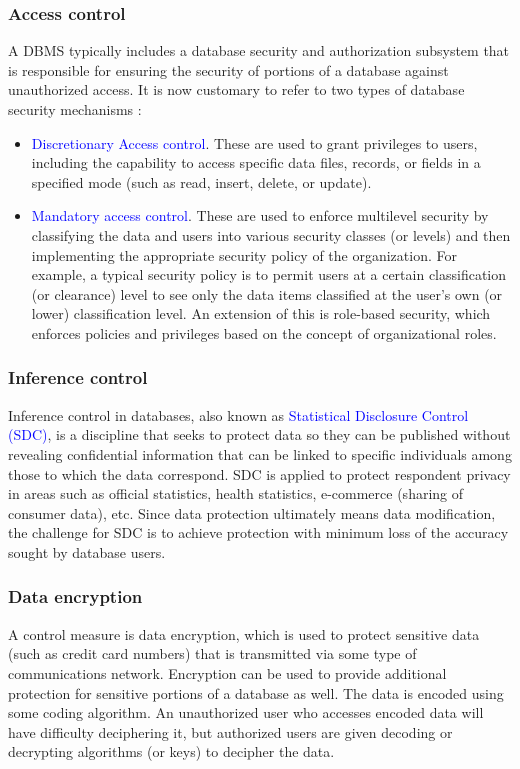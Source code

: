 \documentclass[a4paper]{article}
\numberwithin{equation}{section}
\begin{document}
\subsubsection{Access control}
A DBMS typically includes a database security and authorization subsystem that is responsible for ensuring the security of portions of a database against unauthorized access. It is now customary to refer to two types of database security mechanisms : 
\begin{itemize}
    \item \textcolor{blue}{Discretionary Access control}. These are used to grant privileges to users, including the capability to access specific data files, records, or fields in a specified mode (such as read, insert, delete, or update).
    \item \textcolor{blue}{Mandatory access control}. These are used to enforce multilevel security by classifying the data and users into various security classes (or levels) and then implementing the appropriate security policy of the organization. For example, a typical security policy is to permit users at a certain classification (or clearance) level to see only the data items classified at the user’s own (or lower) classification level. An extension of this is role-based security, which enforces policies and privileges based on the concept of organizational roles.
\end{itemize}

\subsubsection{Inference control}
Inference control in databases, also known as \textcolor{blue}{Statistical Disclosure Control (SDC)}, is a discipline that seeks to protect data so they can be published without revealing confidential information that can be linked to specific individuals among those to which the data correspond. SDC is applied to protect respondent privacy in areas such as official statistics, health statistics, e-commerce (sharing of consumer data), etc. Since data protection ultimately means data modification, the challenge for SDC is to achieve protection with minimum loss of the accuracy sought by database users.

\subsubsection{Data encryption}
A control measure is data encryption, which is used to protect sensitive data (such as credit card numbers) that is transmitted via some type of communications network. Encryption can be used to provide additional protection for sensitive portions of a database as well. The data is encoded using some coding algorithm. An unauthorized user who accesses encoded data will have difficulty deciphering it, but authorized users are given decoding or decrypting algorithms (or keys) to decipher the data.
\end{document}

